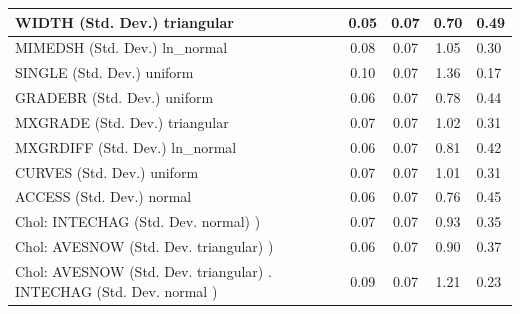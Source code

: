 \begin{table}
\begin{center}
\begin{tabular}{|l|l|c|c|c|l|}
			\hline
			WIDTH (Std. Dev.) triangular &  & 0.05 & 0.07 & 0.70 & 0.49 \\
			\hline
			MIMEDSH (Std. Dev.) ln_normal &  & 0.08 & 0.07 & 1.05 & 0.30 \\
			\hline
			SINGLE (Std. Dev.) uniform &  & 0.10 & 0.07 & 1.36 & 0.17 \\
			\hline
			GRADEBR (Std. Dev.) uniform &  & 0.06 & 0.07 & 0.78 & 0.44 \\
			\hline
			MXGRADE (Std. Dev.) triangular &  & 0.07 & 0.07 & 1.02 & 0.31 \\
			\hline
			MXGRDIFF (Std. Dev.) ln_normal &  & 0.06 & 0.07 & 0.81 & 0.42 \\
			\hline
			CURVES (Std. Dev.) uniform &  & 0.07 & 0.07 & 1.01 & 0.31 \\
			\hline
			ACCESS (Std. Dev.) normal &  & 0.06 & 0.07 & 0.76 & 0.45 \\
			\hline
			 Chol: INTECHAG (Std. Dev. normal) ) &  & 0.07 & 0.07 & 0.93 & 0.35 \\
			\hline
			 Chol: AVESNOW (Std. Dev. triangular) ) &  & 0.06 & 0.07 & 0.90 & 0.37 \\
			\hline
			 Chol: AVESNOW (Std. Dev. triangular) . INTECHAG (Std. Dev.   normal ) &  & 0.09 & 0.07 & 1.21 & 0.23 \\
			\hline
		\end{tabular}
	\end{center}
\end{table}